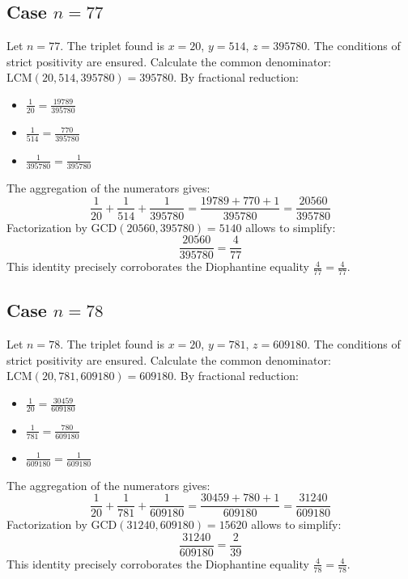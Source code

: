 \documentclass[11pt,a4paper]{article}
\begin{document}
\subsection{Case $n = 77$}
Let $n = 77$. The triplet found is $x = 20$, $y = 514$, $z = 395780$.
The conditions of strict positivity are ensured.
Calculate the common denominator: $\text{LCM}(20, 514, 395780) = 395780$.
By fractional reduction:
\begin{itemize}
    \item $\frac{1}{20} = \frac{19789}{395780}$
    \item $\frac{1}{514} = \frac{770}{395780}$
    \item $\frac{1}{395780} = \frac{1}{395780}$
\end{itemize}
The aggregation of the numerators gives:
$$ \frac{1}{20} + \frac{1}{514} + \frac{1}{395780} = \frac{19789 + 770 + 1}{395780} = \frac{20560}{395780} $$
Factorization by $\text{GCD}(20560, 395780) = 5140$ allows to simplify:
$$ \frac{20560}{395780} = \frac{4}{77} $$
This identity precisely corroborates the Diophantine equality $\frac{4}{77} = \frac{4}{77}$.

\subsection{Case $n = 78$}
Let $n = 78$. The triplet found is $x = 20$, $y = 781$, $z = 609180$.
The conditions of strict positivity are ensured.
Calculate the common denominator: $\text{LCM}(20, 781, 609180) = 609180$.
By fractional reduction:
\begin{itemize}
    \item $\frac{1}{20} = \frac{30459}{609180}$
    \item $\frac{1}{781} = \frac{780}{609180}$
    \item $\frac{1}{609180} = \frac{1}{609180}$
\end{itemize}
The aggregation of the numerators gives:
$$ \frac{1}{20} + \frac{1}{781} + \frac{1}{609180} = \frac{30459 + 780 + 1}{609180} = \frac{31240}{609180} $$
Factorization by $\text{GCD}(31240, 609180) = 15620$ allows to simplify:
$$ \frac{31240}{609180} = \frac{2}{39} $$
This identity precisely corroborates the Diophantine equality $\frac{4}{78} = \frac{4}{78}$.
\end{document}
